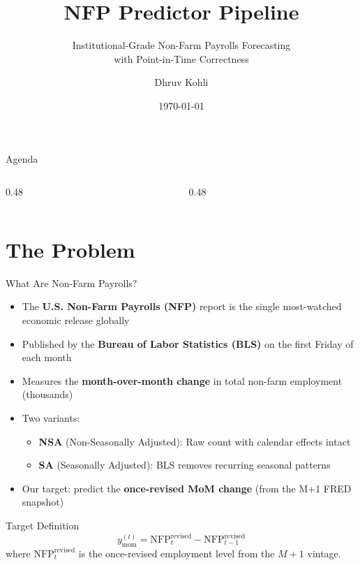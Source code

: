 \documentclass[aspectratio=169,10pt]{beamer}
\title[NFP Predictor]{NFP Predictor Pipeline}
\subtitle{Institutional-Grade Non-Farm Payrolls Forecasting\\with Point-in-Time Correctness}
\author{Dhruv Kohli}
\date{\today}
\institute{}
\begin{document}
\begin{frame}[plain]
\titlepage
\end{frame}

\begin{frame}{Agenda}
\begin{columns}[T]
\begin{column}{0.48\textwidth}
\tableofcontents[sections={1-5}]
\end{column}
\begin{column}{0.48\textwidth}
\tableofcontents[sections={6-9}]
\end{column}
\end{columns}
\end{frame}

\section{The Problem}

\begin{frame}{What Are Non-Farm Payrolls?}
\begin{itemize}
  \item The \textbf{U.S. Non-Farm Payrolls (NFP)} report is the single most-watched economic release globally
  \item Published by the \textbf{Bureau of Labor Statistics (BLS)} on the first Friday of each month
  \item Measures the \textbf{month-over-month change} in total non-farm employment (thousands)
  \item Two variants:
  \begin{itemize}
    \item \textbf{NSA} (Non-Seasonally Adjusted): Raw count with calendar effects intact
    \item \textbf{SA} (Seasonally Adjusted): BLS removes recurring seasonal patterns
  \end{itemize}
  \item Our target: predict the \textbf{once-revised MoM change} (from the M+1 FRED snapshot)
\end{itemize}

\vspace{0.3cm}
\begin{block}{Target Definition}
\[
y_{\text{mom}}^{(t)} = \text{NFP}_{t}^{\text{revised}} - \text{NFP}_{t-1}^{\text{revised}}
\]
where $\text{NFP}_{t}^{\text{revised}}$ is the once-revised employment level from the $M{+}1$ vintage.
\end{block}
\end{frame}
\end{document}
